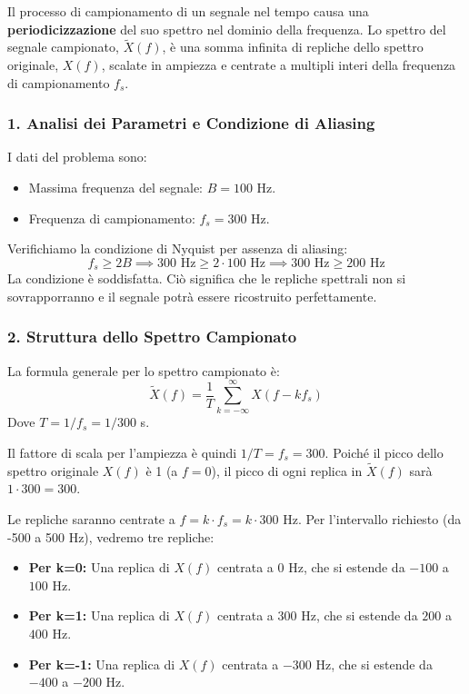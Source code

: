 
\begin{soluzione}{4}
    Il processo di campionamento di un segnale nel tempo causa una \textbf{periodicizzazione} del suo spettro nel dominio della frequenza. Lo spettro del segnale campionato, $\tilde{X}(f)$, è una somma infinita di repliche dello spettro originale, $X(f)$, scalate in ampiezza e centrate a multipli interi della frequenza di campionamento $f_s$.

    \subsubsection*{1. Analisi dei Parametri e Condizione di Aliasing}
    I dati del problema sono:
    \begin{itemize}
        \item Massima frequenza del segnale: $B = 100$ Hz.
        \item Frequenza di campionamento: $f_s = 300$ Hz.
    \end{itemize}
    Verifichiamo la condizione di Nyquist per assenza di aliasing:
    \[
        f_s \ge 2B \implies 300 \text{ Hz} \ge 2 \cdot 100 \text{ Hz} \implies 300 \text{ Hz} \ge 200 \text{ Hz}
    \]
    La condizione è soddisfatta. Ciò significa che le repliche spettrali non si sovrapporranno e il segnale potrà essere ricostruito perfettamente.

    \subsubsection*{2. Struttura dello Spettro Campionato}
    La formula generale per lo spettro campionato è:
    \[
        \tilde{X}(f) = \frac{1}{T} \sum_{k=-\infty}^{\infty} X(f - k f_s)
    \]
    Dove $T = 1/f_s = 1/300$ s.
    
    Il fattore di scala per l'ampiezza è quindi $1/T = f_s = 300$. Poiché il picco dello spettro originale $X(f)$ è 1 (a $f=0$), il picco di ogni replica in $\tilde{X}(f)$ sarà $1 \cdot 300 = 300$.
    
    Le repliche saranno centrate a $f = k \cdot f_s = k \cdot 300$ Hz. Per l'intervallo richiesto (da -500 a 500 Hz), vedremo tre repliche:
    \begin{itemize}
        \item \textbf{Per k=0:} Una replica di $X(f)$ centrata a $0$ Hz, che si estende da $-100$ a $100$ Hz.
        \item \textbf{Per k=1:} Una replica di $X(f)$ centrata a $300$ Hz, che si estende da $200$ a $400$ Hz.
        \item \textbf{Per k=-1:} Una replica di $X(f)$ centrata a $-300$ Hz, che si estende da $-400$ a $-200$ Hz.
    \end{itemize}


\end{soluzione}
